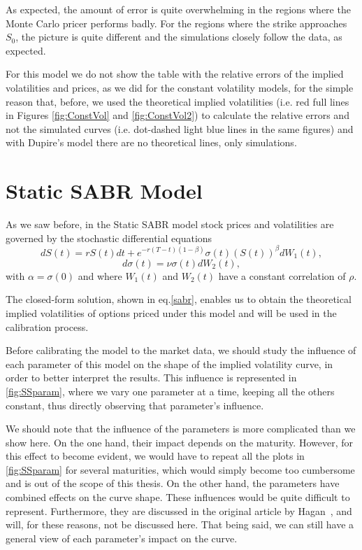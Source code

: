 As expected, the amount of error is quite overwhelming in the regions where the Monte Carlo pricer performs badly. For the regions where the strike approaches $S_0$, the picture is quite different and the simulations closely follow the data, as expected.

For this model we do not show the table with the relative errors of the implied volatilities and prices, as we did for the constant volatility models, for the simple reason that, before, we used the theoretical implied volatilities (i.e. red full lines in Figures \ref{fig:ConstVol} and \ref{fig:ConstVol2}) to calculate the relative errors and not the simulated curves (i.e. dot-dashed light blue lines in the same figures) and with Dupire's model there are no theoretical lines, only simulations. 



\newpage
\section{Static SABR Model}
As we saw before, in the Static SABR model stock prices and volatilities are governed by the stochastic differential equations
\begin{equation}
dS(t)=rS(t)dt+e^{-r(T-t)(1-\beta)}\sigma(t)(S(t))^\beta dW_1(t),
\end{equation}
\begin{equation}
d\sigma(t)=\nu\sigma(t) dW_2(t),
\end{equation}
\noindent with $\alpha=\sigma(0)$ and where $W_1(t)$ and $W_2(t)$ have a constant correlation of $\rho$.

The closed-form solution, shown in eq.\eqref{sabr}, enables us to obtain the theoretical implied volatilities of options priced under this model and will be used in the calibration process.

Before calibrating the model to the market data, we should study the influence of each parameter of this model on the shape of the implied volatility curve, in order to better interpret the results. This influence is represented in \autoref{fig:SSparam}, where we vary one parameter at a time, keeping all the others constant, thus directly observing that parameter's influence.


We should note that the influence of the parameters is more complicated than we show here. On the one hand, their impact depends on the maturity. However, for this effect to become evident, we would have to repeat all the plots in \autoref{fig:SSparam} for several maturities, which would simply become too cumbersome and is out of the scope of this thesis.
On the other hand, the parameters have combined effects on the curve shape. These influences would be quite difficult to represent. Furthermore, they are discussed in the original article by Hagan~\citep{Hagan}, and will, for these reasons, not be discussed here.
That being said, we can still have a general view of each parameter's impact on the curve.

